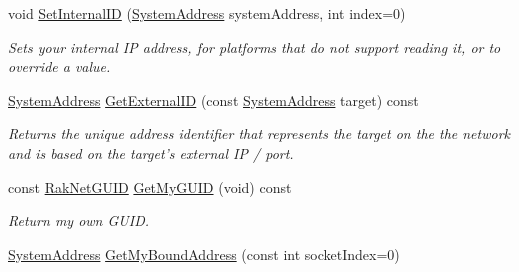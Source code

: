 \begin{DoxyCompactItemize}
$$void \hyperlink{class_rak_net_1_1_rak_peer_ad02c3a4e4c4063771fb47fe20d4b47af}{Set\-Internal\-I\-D} (\hyperlink{struct_rak_net_1_1_system_address}{System\-Address} system\-Address, int index=0)
\begin{DoxyCompactList}\small\item\em Sets your internal I\-P address, for platforms that do not support reading it, or to override a value. \end{DoxyCompactList}\item 
\hyperlink{struct_rak_net_1_1_system_address}{System\-Address} \hyperlink{class_rak_net_1_1_rak_peer_a96f0e923c413fe2319d17862605d6622}{Get\-External\-I\-D} (const \hyperlink{struct_rak_net_1_1_system_address}{System\-Address} target) const 
\begin{DoxyCompactList}\small\item\em Returns the unique address identifier that represents the target on the the network and is based on the target's external I\-P / port. \end{DoxyCompactList}\item 
\hypertarget{class_rak_net_1_1_rak_peer_a3fa1d1f5b3227506bb827e722cfb78fa}{const \hyperlink{struct_rak_net_1_1_rak_net_g_u_i_d}{Rak\-Net\-G\-U\-I\-D} \hyperlink{class_rak_net_1_1_rak_peer_a3fa1d1f5b3227506bb827e722cfb78fa}{Get\-My\-G\-U\-I\-D} (void) const }\label{class_rak_net_1_1_rak_peer_a3fa1d1f5b3227506bb827e722cfb78fa}

\begin{DoxyCompactList}\small\item\em Return my own G\-U\-I\-D. \end{DoxyCompactList}\item 
\hypertarget{class_rak_net_1_1_rak_peer_a1566deab65341e8b665f7643b3a3bcf9}{\hyperlink{struct_rak_net_1_1_system_address}{System\-Address} \hyperlink{class_rak_net_1_1_rak_peer_a1566deab65341e8b665f7643b3a3bcf9}{Get\-My\-Bound\-Address} (const int socket\-Index=0)}\label{class_rak_net_1_1_rak_peer_a1566deab65341e8b665f7643b3a3bcf9}


\end{DoxyCompactItemize}
